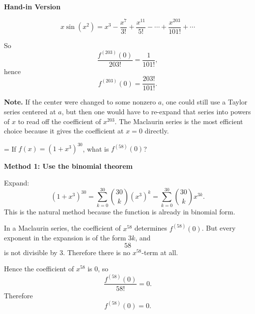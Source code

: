 \documentclass[a4paper,12pt,twocolumn]{article}
\newlength{\problemnumberwidth}
\newenvironment{solutionbox}{\begin{framed}}{\end{framed}}
\newcommand{\problem}[3]{%
  \Needspace{10\baselineskip}%
  \phantomsection\label{#1}%
  \par\vspace{0.8em}%
  \noindent
  \hangindent=\problemnumberwidth
  \hangafter=1
  \makebox[\problemnumberwidth][l]{\textbf{#2.}}#3\par
}
\begin{document}
\begin{solutionbox}
\textbf{Hand-in Version}

\[
x\sin(x^2)
=x^3-\frac{x^7}{3!}+\frac{x^{11}}{5!}-\cdots+\frac{x^{203}}{101!}+\cdots
\]

So
\[
\frac{f^{(203)}(0)}{203!}=\frac{1}{101!},
\]
hence
\[
\boxed{f^{(203)}(0)=\frac{203!}{101!}}.
\]

\medskip
\noindent\textbf{Note.} If the center were changed to some nonzero \(a\), one could still use a Taylor series centered at \(a\), but then one would have to re-expand that series into powers of \(x\) to read off the coefficient of \(x^{203}\). The Maclaurin series is the most efficient choice because it gives the coefficient at \(x=0\) directly.
\end{solutionbox}

\problem{prob:11-10-94}{94}{If \(f(x)=(1+x^3)^{30}\), what is \(f^{(58)}(0)\)?}

\begin{solutionbox}
\textbf{Method 1: Use the binomial theorem}

\begin{steps}
\item Expand:
\[
(1+x^3)^{30}
=\sum_{k=0}^{30}\binom{30}{k}(x^3)^k
=\sum_{k=0}^{30}\binom{30}{k}x^{3k}.
\]
This is the natural method because the function is already in binomial form.

\item In a Maclaurin series, the coefficient of \(x^{58}\) determines \(f^{(58)}(0)\). But every exponent in the expansion is of the form \(3k\), and
\[
58
\]
is not divisible by \(3\). Therefore there is no \(x^{58}\)-term at all.

\item Hence the coefficient of \(x^{58}\) is \(0\), so
\[
\frac{f^{(58)}(0)}{58!}=0.
\]
Therefore
\[
\boxed{f^{(58)}(0)=0}.
\]
\end{steps}
\end{solutionbox}
\end{document}
